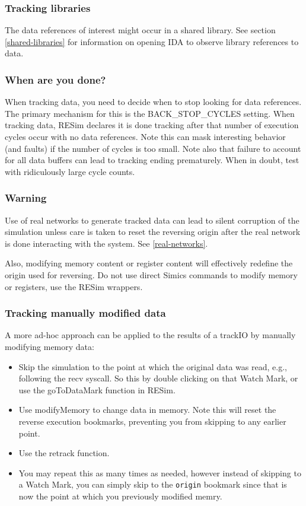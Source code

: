 \documentclass[titlepage]{article}
\begin{document}
\subsubsection{Tracking libraries}
The data references of interest might occur in a shared library.  See section \ref{shared-libraries} for information on opening IDA to 
observe library references to data.

\subsubsection{When are you done?}
When tracking data, you need to decide when to stop looking for data references.  The primary mechanism for this is the BACK\_STOP\_CYCLES
setting.  When tracking data, RESim declares it is done tracking after that number of execution cycles occur with no data references.
Note this can mask interesting behavior (and faults) if the number of cycles is too small.  Note also that failure to account for all data
buffers can lead to tracking ending prematurely.  When in doubt, test with ridiculously large cycle counts.

\subsubsection{Warning}
Use of real networks to generate tracked data can lead to silent corruption of the simulation unless care is taken to reset the reversing origin
after the real network is done interacting with the system.  See \ref{real-networks}.

Also, modifying memory content or register content will effectively redefine the origin used for reversing.  Do not use direct Simics commands to modify 
memory or registers, use the RESim wrappers.

\subsubsection{Tracking manually modified data}
A more ad-hoc approach can be applied to the results of a trackIO by manually modifying memory data:
\begin{itemize}
\item Skip the simulation to the point at which the original data was read, e.g., following the recv syscall.  So this by double clicking
on that Watch Mark, or use the goToDataMark function in RESim.
\item Use modifyMemory to change data in memory.  Note this will reset the reverse execution bookmarks, preventing you from skipping to
any earlier point.
\item Use the retrack function.
\item You may repeat this as many times as needed, however instead of skipping to a Watch Mark, you can simply skip to the {\tt origin}
bookmark since that is now the point at which you previously modified memry.
\end{itemize}
\end{document}
